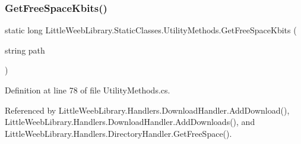 \mbox{\label{class_little_weeb_library_1_1_static_classes_1_1_utility_methods_a76fa2aea99ce4b1ad4130cc18b1d5969}} 
\subsubsection{\texorpdfstring{Get\+Free\+Space\+Kbits()}{GetFreeSpaceKbits()}}
{\footnotesize\ttfamily static long Little\+Weeb\+Library.\+Static\+Classes.\+Utility\+Methods.\+Get\+Free\+Space\+Kbits (\begin{DoxyParamCaption}\item[{string}]{path }\end{DoxyParamCaption})\hspace{0.3cm}{\ttfamily [static]}}



Definition at line 78 of file Utility\+Methods.\+cs.



Referenced by Little\+Weeb\+Library.\+Handlers.\+Download\+Handler.\+Add\+Download(), Little\+Weeb\+Library.\+Handlers.\+Download\+Handler.\+Add\+Downloads(), and Little\+Weeb\+Library.\+Handlers.\+Directory\+Handler.\+Get\+Free\+Space().


